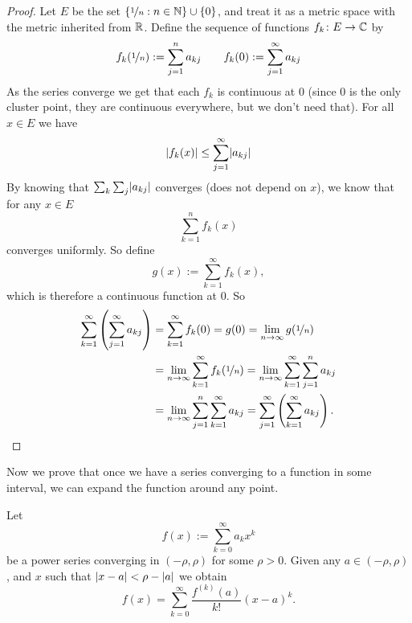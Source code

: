 \begin{proof}
Let $E$ be the set $\{ \nicefrac{1}{n} : n \in {\mathbb{N}} \} \cup \{ 0 \}$,
and treat it as a metric space with the metric inherited from ${\mathbb{R}}$.
Define the sequence of functions $f_k \colon E \to {\mathbb{C}}$
by
\begin{equation*}
f_k(\nicefrac{1}{n}) := \sum_{j=1}^n a_{kj}
\qquad
f_k(0) := \sum_{j=1}^\infty a_{kj}
\end{equation*}
As the series converge we get that each $f_k$ is continuous at $0$
(since 0 is the only cluster point, they are continuous everywhere, but
we don't need that).
For all $x \in E$ we have
\begin{equation*}
\lvert {f_k(x)} \rvert \leq \sum_{j=1}^\infty \lvert {a_{kj}} \rvert
\end{equation*}
By knowing that $\sum_k \sum_j \lvert {a_{kj}} \rvert$ converges (does not depend on
$x$), we know that for any $x \in E$
\begin{equation*}
\sum_{k=1}^n f_k(x)
\end{equation*}
converges uniformly.  So define
\begin{equation*}
g(x) := \sum_{k=1}^\infty f_k(x) ,
\end{equation*}
which is therefore a continuous function at $0$.
So
\begin{equation*}
\begin{split}
\sum_{k=1}^\infty \left( \sum_{j=1}^\infty a_{kj} \right)
& =
\sum_{k=1}^\infty f_k(0)
= g(0)
= \lim_{n\to\infty} g(\nicefrac{1}{n}) \\
&= 
\lim_{n\to\infty}\sum_{k=1}^\infty f_k(\nicefrac{1}{n})
= 
\lim_{n\to\infty}\sum_{k=1}^\infty \sum_{j=1}^n a_{kj} \\
&= 
\lim_{n\to\infty}\sum_{j=1}^n \sum_{k=1}^\infty a_{kj}
= 
\sum_{j=1}^\infty \left( \sum_{k=1}^\infty a_{kj} \right) . \qedhere
\end{split}
\end{equation*}
\end{proof}

Now we prove that once we have a series converging to a function
in some interval, we can expand the function around any point.

\begin{thm}
\label{thm:tayloranal}
Let
\begin{equation*}
f(x) := \sum_{k=0}^\infty a_k x^k
\end{equation*}
be a power series converging in $(-\rho,\rho)$ for some $\rho > 0$.  Given any $a \in
(-\rho,\rho)$,
and $x$ such that $\lvert {x-a} \rvert < \rho-\lvert {a} \rvert$ we obtain
\begin{equation*}
f(x) =
\sum_{k=0}^\infty \frac{f^{(k)}(a)}{k!} {(x-a)}^{k} .
\end{equation*}
\end{thm}


